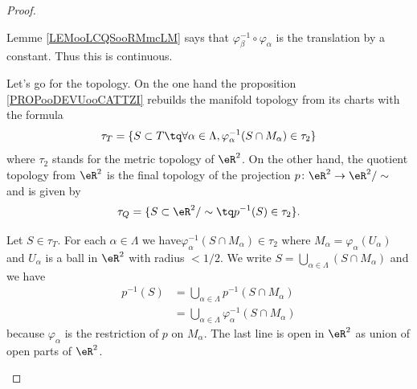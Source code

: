 \begin{proof}
\begin{subproof}
\begin{subproof}
			\spitem[Continuity]
			Lemme \ref{LEMooLCQSooRMmcLM} says that \( \varphi_{\beta}^{-1}\circ \varphi_{\alpha}\) is the translation by a constant. Thus this is continuous.
		\end{subproof}
	\end{subproof}
	Let's go for the topology. On the one hand the proposition \ref{PROPooDEVUooCATTZI} rebuilds the manifold topology from its charts with the formula
	\begin{equation}
		\tau_T=\{ S\subset T \tq \forall\alpha\in \Lambda,\varphi_{\alpha}^{-1}(S\cap M_{\alpha})\in \tau_2\}
	\end{equation}
	where \( \tau_2\) stands for the metric topology of \( \eR^2\). On the other hand, the quotient topology from \( \eR^2\) is the final topology of the projection \(p \colon \eR^2\to \eR^2/\sim  \) and is given by
	\begin{equation}
		\tau_Q=\{ S\subset \eR^2/\sim\tq p^{-1}(S)\in \tau_2 \}.
	\end{equation}

	\begin{subproof}
		Let \( S\in\tau_T\). For each \( \alpha\in \Lambda\) we have\( \varphi^{-1}_{\alpha}(S\cap M_{\alpha})\in \tau_2\) where \( M_{\alpha}=\varphi_{\alpha}(U_{\alpha})\) and \( U_{\alpha}\) is a ball in \( \eR^2\) with radius \( <1/2\). We write \( S=\bigcup_{\alpha\in\Lambda}(S\cap M_{\alpha})\) and we have
		\begin{subequations}
			\begin{align}
				p^{-1}(S) & =\bigcup_{\alpha\in \Lambda}p^{-1}(S\cap M_{\alpha})                \\
				          & =\bigcup_{\alpha\in \Lambda}\varphi_{\alpha}^{-1}(S\cap M_{\alpha})
			\end{align}
		\end{subequations}
		because \( \varphi_{\alpha}\) is the restriction of \( p\) on \( M_{\alpha}\). The last line is open in \( \eR^2\) as union of open parts of \( \eR^2\).


\end{subproof}
\end{proof}
